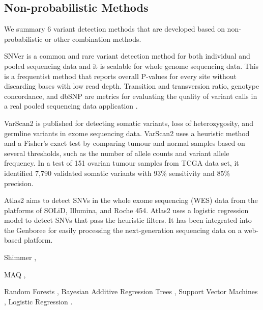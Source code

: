 \documentclass[11pt,reqno]{amsart}
\begin{document}
\subsection{Non-probabilistic Methods}
We summary 6 variant detection methods that are developed based on non-probabilistic or other combination methods.

SNVer \citep{Wei2011} is a common and rare variant detection method for both individual and pooled sequencing data and it is scalable for whole genome sequencing data.
This is a frequentist method that reports overall P-values for every site without discarding bases with low read depth.
Transition and transversion ratio, genotype concordance, and dbSNP are metrics for evaluating the quality of variant calls in a real pooled sequencing data application \citep{depristo2011framework}.

VarScan2 \citep{Koboldt2012} is published for detecting somatic variants, loss of heterozygosity, and germline variants in exome sequencing data.
VarScan2 uses a heuristic method and a Fisher's exact test by comparing tumour and normal samples based on several thresholds, such as the number of allele counts and variant allele frequency.
In a test of 151 ovarian tumour samples from TCGA data set, it identified 7,790 validated somatic variants with 93\% sensitivity and 85\% precision.

Atlas2 \citep{challis2012integrative} aims to detect SNVs in the whole exome sequencing (WES) data from the platforms of SOLiD, Illumina, and Roche 454.
Atlas2 uses a logistic regression model to detect SNVs that pass the heuristic filters.
It has been integrated into the Genboree for easily processing the next-generation sequencing data on a web-based platform.

Shimmer \citep{Hansen2013},

MAQ \citep{Li2008},

Random Forests \citep{Ding2012},
Bayesian Additive Regression Trees \citep{Ding2012},
Support Vector Machines \citep{Ding2012},
Logistic Regression \citep{Ding2012}.




\end{document}
